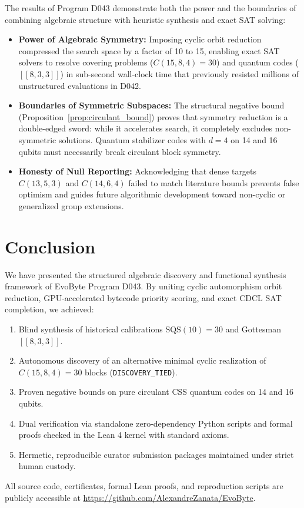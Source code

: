 \documentclass[11pt,a4paper]{article}
\begin{document}
The results of Program D043 demonstrate both the power and the boundaries of combining algebraic structure with heuristic synthesis and exact SAT solving:
\begin{itemize}
    \item \textbf{Power of Algebraic Symmetry:} Imposing cyclic orbit reduction compressed the search space by a factor of 10 to 15, enabling exact SAT solvers to resolve covering problems ($C(15, 8, 4) = 30$) and quantum codes ($[[8, 3, 3]]$) in sub-second wall-clock time that previously resisted millions of unstructured evaluations in D042.
    \item \textbf{Boundaries of Symmetric Subspaces:} The structural negative bound (Proposition~\ref{prop:circulant_bound}) proves that symmetry reduction is a double-edged sword: while it accelerates search, it completely excludes non-symmetric solutions. Quantum stabilizer codes with $d=4$ on 14 and 16 qubits must necessarily break circulant block symmetry.
    \item \textbf{Honesty of Null Reporting:} Acknowledging that dense targets $C(13, 5, 3)$ and $C(14, 6, 4)$ failed to match literature bounds prevents false optimism and guides future algorithmic development toward non-cyclic or generalized group extensions.
\end{itemize}

\section{Conclusion}
\label{sec:conclusion}
We have presented the structured algebraic discovery and functional synthesis framework of EvoByte Program D043. By uniting cyclic automorphism orbit reduction, GPU-accelerated bytecode priority scoring, and exact CDCL SAT completion, we achieved:
\begin{enumerate}
    \item Blind synthesis of historical calibrations $\text{SQS}(10) = 30$ and Gottesman $[[8, 3, 3]]$.
    \item Autonomous discovery of an alternative minimal cyclic realization of $C(15, 8, 4) = 30$ blocks (\texttt{DISCOVERY\_TIED}).
    \item Proven negative bounds on pure circulant CSS quantum codes on 14 and 16 qubits.
    \item Dual verification via standalone zero-dependency Python scripts and formal proofs checked in the Lean 4 kernel with standard axioms.
    \item Hermetic, reproducible curator submission packages maintained under strict human custody.
\end{enumerate}
All source code, certificates, formal Lean proofs, and reproduction scripts are publicly accessible at \url{https://github.com/AlexandreZanata/EvoByte}.



\end{document}
